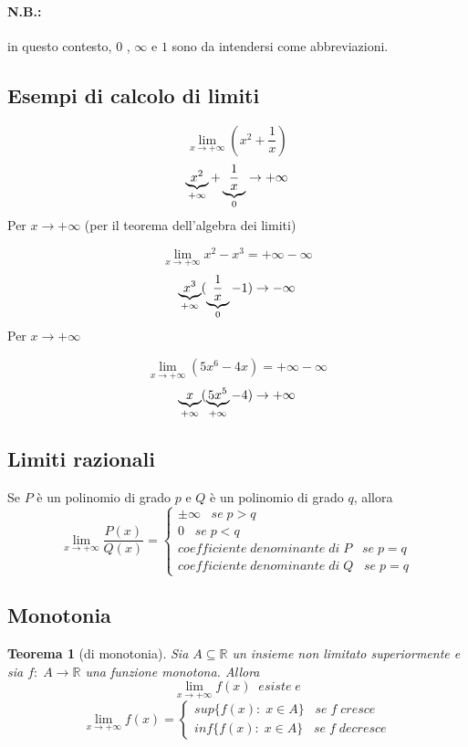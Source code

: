 \documentclass[a4paper]{article}
\newtheorem{theorem}{Teorema}
\theoremstyle{break}
\theoremstyle{break}
\theoremstyle{break}
\theoremstyle{break}
\begin{document}
\paragraph{\textbf{N.B.:}} in questo contesto, \( 0 \) , \( \infty \) e \( 1 \) sono da intendersi
come abbreviazioni.

\subsection{Esempi di calcolo di limiti}
\begin{example}
	\[ \lim_{x \to +\infty} (x^2+\frac{1}{x})  \]
	\[
		\underbrace{x^2}_\text{\( +\infty \)} + \underbrace{\frac{1}{x}}_\text{\( 0 \)} \to +\infty
	\]
	Per \( x \to +\infty \) (per il teorema dell'algebra dei limiti)
\end{example}
\begin{example}
	\[
		\lim_{x \to +\infty} x^2-x^3 = +\infty - \infty
	\]
	\[
		\underbrace{x^3}_\text{\( +\infty \)}(\underbrace{\frac{1}{x}}_\text{\( 0 \)} - 1) \to -\infty
	\]
	Per \( x \to +\infty \)
\end{example}
\begin{example}
	\[
		\lim_{x \to +\infty} (5x^6-4x) = +\infty - \infty
	\]
	\[
		\underbrace{x}_\text{\( +\infty \)}(\underbrace{5x^5}_\text{\( +\infty \)} - 4) \to +\infty
	\]
\end{example}


\subsection{Limiti razionali}
Se \( P \) è un polinomio di grado \( p \) e \( Q \) è un polinomio di grado \( q \), allora
\[
	\lim_{x \to +\infty} \frac{P(x)}{Q(x)}=
	\begin{cases}
		\pm \infty\;\;\; se\; p > q                          \\
		0\;\;\; se\; p < q                                   \\
		coefficiente\; denominante\; di\; P\;\;\; se\; p = q \\
		coefficiente\; denominante\; di\; Q\;\;\; se\; p = q
	\end{cases}
\]

\subsection{Monotonia}
\begin{theorem}[di monotonia]
	Sia \( A \subseteq \mathbb{R}\) un insieme non limitato superiormente e sia \( f:\;A \to \mathbb{R} \)
	una funzione monotona. Allora
	\[
		\lim_{x \to +\infty} f(x)\;\;esiste\;e
	\]
	\[
		\lim_{x \to +\infty} f(x) =
		\begin{cases}
			sup\{ f(x):\; x \in A \}\;\;\; se\;f\;cresce \\
			inf\{ f(x):\; x \in A \}\;\;\; se\;f\;decresce
		\end{cases}
	\]
\end{theorem}
\end{document}
